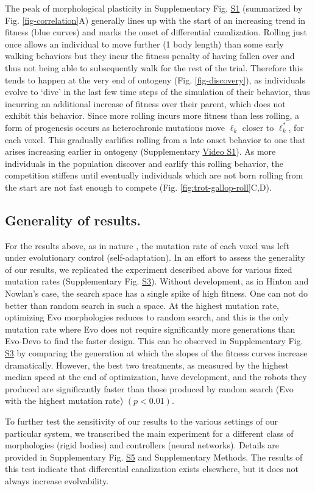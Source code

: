The peak of morphological plasticity in  Supplementary Fig. \hyperref[fig:S1]{S1} (summarized by Fig. \ref{fig-correlation}A) generally lines up with the start of an increasing trend in fitness (blue curves) and marks the onset of differential canalization.
Rolling just once allows an individual to move further (1 body length) than some early walking behaviors but they incur the fitness penalty of having fallen over and thus not being able to subsequently walk for the rest of the trial. 
Therefore this tends to happen at the very end of ontogeny (Fig. \ref{fig-discovery}), as individuals evolve to `dive' in the last few time steps of the simulation of their behavior, thus incurring an additional increase of fitness over their parent, which does not exhibit this behavior.
Since more rolling incurs more fitness than less rolling, a form of progenesis occurs as heterochronic mutations move $\ell_k$ closer to $\ell_k^*$, for each voxel.
This gradually earlifies rolling from a late onset behavior to one that arises increasing earlier in ontogeny (Supplementary \href{https://youtu.be/Ee2sU-AZWC4}{Video S1}).
As more individuals in the population discover and earlify this rolling behavior, the competition stiffens until eventually individuals which are not born rolling from the start are not fast enough to compete (Fig. \ref{fig:trot-gallop-roll}C,D).


\subsection{Generality of results.}


For the results above, as in nature \cite{lynch2010evolution}, the mutation rate of each voxel was left under evolutionary control (self-adaptation).
In an effort to assess the generality of our results, we replicated the experiment described above for various fixed mutation rates (Supplementary Fig. \hyperref[fig:S3]{S3}).
Without development, as in Hinton and Nowlan's case\cite{hinton1987learning}, the search space has a single spike of high fitness. 
One can not do better than random search in such a space.
At the highest mutation rate, optimizing Evo morphologies reduces to random search, and this is the only mutation rate where Evo does not require significantly more generations than Evo-Devo to find the faster design. 
This can be observed in Supplementary Fig. \hyperref[fig:S3]{S3} by comparing the generation at which the slopes of the fitness curves increase dramatically. 
However, the best two treatments, as measured by the highest median speed at the end of optimization, have development, and the robots they produced are significantly faster than those produced by random search (Evo with the highest mutation rate) $(p<0.01)$.

To further test the sensitivity of our results to the various settings of our particular system,
we transcribed the main experiment for a different class of morphologies (rigid bodies) and controllers (neural networks).
Details are provided in Supplementary Fig. \hyperref[fig:S5]{S5} and Supplementary Methods.
The results of this test indicate that differential canalization exists elsewhere, but it does not always increase evolvability.  


